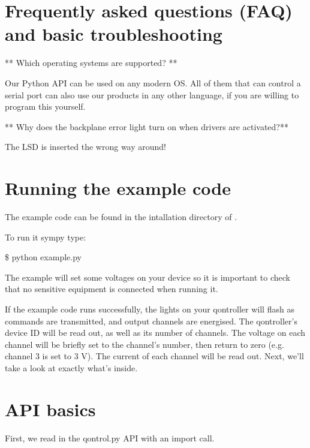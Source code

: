 \documentclass[letterpaper,10pt,english]{sphinxmanual}
\begin{document}
\section{Frequently asked questions (FAQ) and basic troubleshooting}
\label{\detokenize{guide/getting_started:frequently-asked-questions-faq-and-basic-troubleshooting}}
** Which operating systems are supported? **

Our Python API can be used on any modern OS. All of them that can control a serial port can also use our products in any other language, if you are willing to program this yourself.

** Why does the backplane error light turn on when drivers are activated?**

The LSD is inserted the wrong way around!


\section{Running the example code}
\label{\detokenize{guide/getting_started:running-the-example-code}}
The example code  can be found in the intallation directory of .

To run it sympy type:

\$ python example.py

The example will set some voltages on your device so it is important to check that no sensitive equipment is connected when running it.

If the example code runs successfully, the lights on your qontroller will flash as commands are transmitted, and output channels are energised.
The qontroller’s device ID will be read out, as well as its number of channels. The voltage on each channel will be briefly set to the channel’s number,
then return to zero (e.g. channel 3 is set to 3 V). The current of each channel will be read out. Next, we’ll take a look at exactly what’s inside.


\section{API basics}
\label{\detokenize{guide/getting_started:api-basics}}
First, we read in the qontrol.py API with an import call.

%
\begin{sphinxVerbatim}[commandchars=\\\{\}]
 
\end{sphinxVerbatim}
\end{document}
